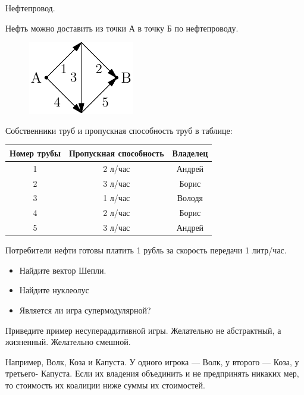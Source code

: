 \begin{problem}
Нефтепровод.

Нефть можно доставить из точки А в точку Б по нефтепроводу.

\begin{figure}[htbp]
	\includegraphics{coop_nefteprovod.pdf}
\end{figure}

Собственники труб и пропускная способность труб в таблице:

\begin{tabular}{|c|c|c|}

\hline
Номер трубы & Пропускная способность & Владелец \\
\hline
1 & 2 л/час & Андрей \\
2 & 3 л/час & Борис \\
3 & 1 л/час & Володя \\
4 & 2 л/час & Борис \\
5 & 3 л/час & Андрей \\
\hline
\end{tabular}

Потребители нефти готовы платить 1 рубль за скорость передачи 1 литр/час.
\begin{itemize}
\item Найдите вектор Шепли.
\item Найдите нуклеолус

\item Является ли игра супермодулярной?
\end{itemize}



\begin{sol}

\end{sol}
\end{problem}






\begin{problem}
Приведите пример несупераддитивной игры. Желательно не абстрактный, а жизненный. Желательно смешной.



\begin{sol}
Например, Волк, Коза и Капуста. У одного игрока — Волк, у второго — Коза, у третьего- Капуста. Если их владения объединить и не предпринять никаких мер, то стоимость их коалиции ниже суммы их стоимостей.
\end{sol}
\end{problem}





